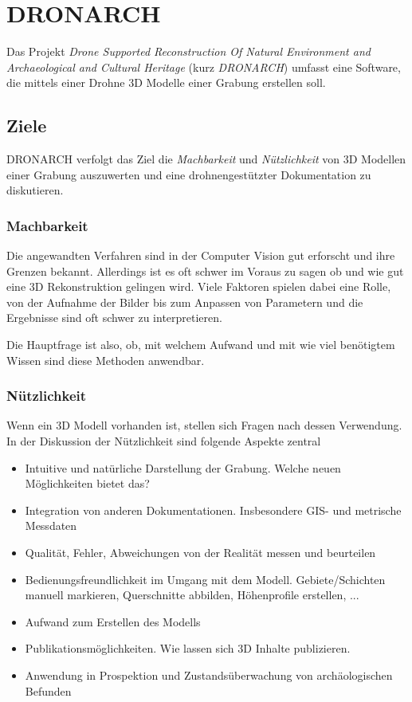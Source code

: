 \documentclass{paper}
\begin{document}
	\section{DRONARCH}
		Das Projekt \emph{Drone Supported Reconstruction Of Natural Environment and Archaeological and Cultural Heritage} (kurz \emph{DRONARCH}) umfasst eine Software, die mittels einer Drohne 3D Modelle einer Grabung erstellen soll.
		
		\subsection{Ziele} \label{einf:ziele}
			DRONARCH verfolgt das Ziel die \emph{Machbarkeit} und \emph{Nützlichkeit} von 3D Modellen einer Grabung auszuwerten und eine drohnengestützter Dokumentation zu diskutieren.
				
			\subsubsection{Machbarkeit}
				Die angewandten Verfahren sind in der Computer Vision gut erforscht und ihre Grenzen bekannt. Allerdings ist es oft schwer im Voraus zu sagen ob und wie gut eine 3D Rekonstruktion gelingen wird. Viele Faktoren spielen dabei eine Rolle, von der Aufnahme der Bilder bis zum Anpassen von Parametern und die Ergebnisse sind oft schwer zu interpretieren.
				
				Die Hauptfrage ist also, ob, mit welchem Aufwand und mit wie viel benötigtem Wissen sind diese Methoden anwendbar.
			
			\subsubsection{Nützlichkeit}
				Wenn ein 3D Modell vorhanden ist, stellen sich Fragen nach dessen Verwendung.
				In der Diskussion der Nützlichkeit sind folgende Aspekte zentral
				\begin{itemize}
					\item
						Intuitive und natürliche Darstellung der Grabung. Welche neuen Möglichkeiten bietet das?
					\item
						Integration von anderen Dokumentationen. Insbesondere GIS- und metrische Messdaten
					\item
						Qualität, Fehler, Abweichungen von der Realität messen und beurteilen
					\item
						Bedienungsfreundlichkeit im Umgang mit dem Modell. Gebiete/Schichten manuell markieren, Querschnitte abbilden, Höhenprofile erstellen, ...
					\item
						Aufwand zum Erstellen des Modells
					\item
						Publikationsmöglichkeiten. Wie lassen sich 3D Inhalte publizieren.
					\item
						Anwendung in Prospektion und Zustandsüberwachung von archäologischen Befunden
				\end{itemize}
				
\end{document}
